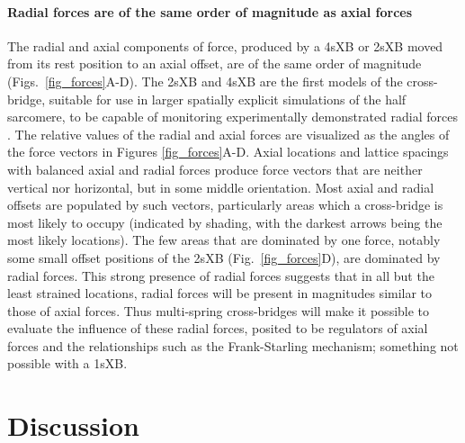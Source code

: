 \documentclass[]{article}
\begin{document}
\paragraph{Radial forces are of the same order of magnitude as axial forces} %
The radial and axial components of force, produced by a 4sXB or 2sXB moved from its rest position to an axial offset, are of the same order of magnitude (Figs.~\ref{fig_forces}A-D). 
The 2sXB and 4sXB are the first models of the cross-bridge, suitable for use in larger spatially explicit simulations of the half sarcomere, to be capable of monitoring experimentally demonstrated radial forces \citep{Cecchi1990, Millman1998}. 
The relative values of the radial and axial forces are visualized as the angles of the force vectors in Figures \ref{fig_forces}A-D. 
Axial locations and lattice spacings with balanced axial and radial forces produce force vectors that are neither vertical nor horizontal, but in some middle orientation.
Most axial and radial offsets are populated by such vectors, particularly areas which a cross-bridge is most likely to occupy (indicated by shading, with the darkest arrows being the most likely locations). 
The few areas that are dominated by one force, notably some small offset positions of the 2sXB (Fig.~\ref{fig_forces}D), are dominated by radial forces.
This strong presence of radial forces suggests that in all but the least strained locations, radial forces will be present in magnitudes similar to those of axial forces. 
Thus multi-spring cross-bridges will make it possible to evaluate the influence of these radial forces, posited to be regulators of axial forces and the relationships such as the Frank-Starling mechanism; something not possible with a 1sXB. 



\section{Discussion} %

\end{document}
